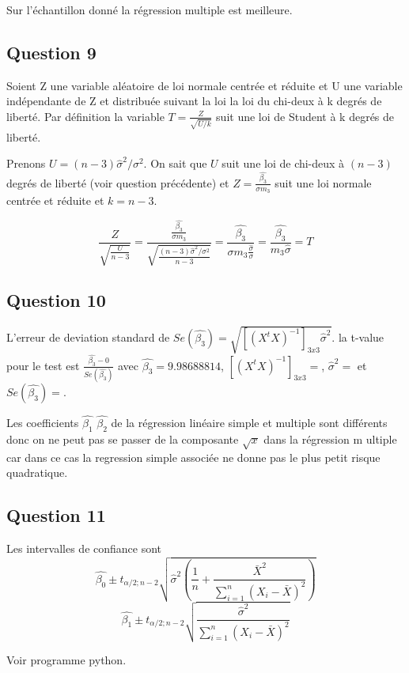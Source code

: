 \documentclass[pdflatex]{article}
\theoremstyle{definition}
\begin{document}
Sur l'\'echantillon donn\'e la r\'egression multiple est meilleure. 

\subsection*{Question 9}
Soient Z une variable al\'eatoire de loi normale centr\'ee et r\'eduite et U une variable ind\'ependante de Z et distribu\'ee suivant la loi la loi du chi-deux \`a k degr\'es de libert\'e. Par d\'efinition la variable $T=\frac {Z}{\sqrt {U/k}}$ suit une loi de Student \`a k degr\'es de libert\'e.

Prenons $U = (n-3)\hat{\sigma}^2/\sigma^2$. On sait que $U$ suit une loi de chi-deux \`a $(n-3)$ degr\'es de libert\'e (voir question pr\'ec\'edente) et $Z = \frac{\hat{\beta_3}}{\sigma m_3}$ suit une loi normale centr\'ee et r\'eduite et $k = n-3$.

$$
\frac{Z}{\sqrt{\frac{U}{n-3}}} = \frac{\frac{\hat{\beta_3}}{\sigma m_3}}{\sqrt{\frac{(n-3)\hat{\sigma}^2/\sigma^2}{n-3}}}
= \frac{\hat{\beta_3}}{\sigma m_3 \frac{\hat{\sigma}}{\sigma}} 
= \frac{\hat{\beta_3}}{m_3 \hat{\sigma}} = T
$$


\subsection*{Question 10}
L'erreur de deviation standard de $Se(\hat{\beta_3}) = \sqrt{[(X^tX)^{-1}]_{3x3}\hat{\sigma}^2}$. la t-value pour le test est $\frac{\hat{\beta_3} - 0}{Se(\hat{\beta_3})}$ avec $\hat{\beta_3} = 9.98688814$, $[(X^tX)^{-1}]_{3x3} = $, $\hat{\sigma}^2 = $ et $Se(\hat{\beta_3}) = $.

Les coefficients $\hat{\beta_1}$ $\hat{\beta_2}$ de la r\'egression lin\'eaire simple et multiple sont diff\'erents donc on ne peut pas se passer de la composante $\sqrt{x}$ dans la r\'egression m ultiple car dans ce cas la regression simple associ\'ee ne donne pas le plus petit risque quadratique.  

\subsection*{Question 11}
Les intervalles de confiance sont 
$$
\hat{\beta_0} \pm t_{\alpha/2;n-2}\sqrt{\hat{\sigma}^2\left(\frac{1}{n}+\frac{\bar{X}^2}{\sum_{i=1}^{n}{(X_i-\bar{X})^2}}\right)}
$$
$$
\hat{\beta_1} \pm t_{\alpha/2;n-2}\sqrt{\frac{\hat{\sigma}^2}{\sum_{i=1}^{n}{(X_i-\bar{X})^2}}}
$$

Voir programme python.
\end{document}
